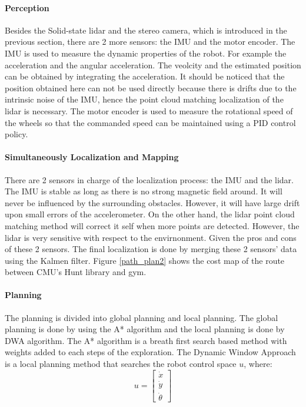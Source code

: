 \documentclass[balance,upint,subscriptcorrection,varvw,nofoot, mathalfa=cal=boondoxo,spanish,french,vietnamese,russian,greek,pdf-a,fontspec,colorlinks]{asmeconf}
\begin{document}
\paragraph{Perception} Besides the Solid-state lidar and the stereo camera, which is introduced in the previous section, there are 2 more sensors: the IMU and the motor encoder. The IMU is used to measure the dynamic properties of the robot. For example the acceleration and the angular acceleration. The veolcity and the estimated position can be obtained by integrating the acceleration. It should be noticed that the position obtained here can not be used directly because there is drifts due to the intrinsic noise of the IMU, hence the point cloud matching localization of the lidar is necessary. The motor encoder is used to measure the rotational speed of the wheels so that the commanded speed can be maintained using a PID control policy.
\paragraph{Simultaneously Localization and Mapping} There are 2 sensors in charge of the localization process: the IMU and the lidar. The IMU is stable as long as there is no strong magnetic field around. It will never be influenced by the surrounding obstacles. However, it will have large drift upon small errors of the accelerometer. On the other hand, the lidar point cloud matching method will correct it self when more points are detected. However, the lidar is very sensitive with respect to the envirnonment. Given the pros and cons of these 2 sensors. The final localization is done by merging these 2 sensors' data using the Kalmen filter.
Figure \ref{path_plan2} shows the cost map of the route between CMU's Hunt library and gym.  
\paragraph{Planning} The planning is divided into global planning and local planning. The global planning is done by using the A* algorithm and the local planning is done by DWA algorithm. The A* algorithm is a breath first search based method with weights added to each steps of the exploration. The Dynamic Window Approach is a local planning method that searches the robot control space $u$, where:
\begin{equation}
	u=\left[\begin{array}{c}\dot{x}\\\dot{y}\\\dot{\theta}\end{array}\right]
\end{equation}
\end{document}
